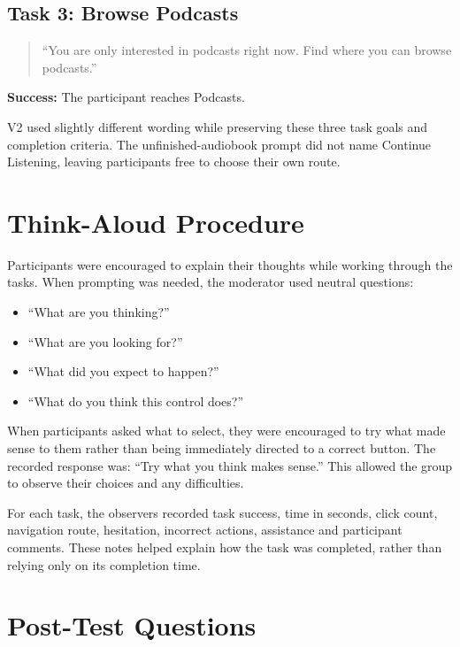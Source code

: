 \begin{samepage}
\subsection*{Task 3: Browse Podcasts}

\begin{quote}
``You are only interested in podcasts right now. Find where you can browse podcasts.''
\end{quote}

\noindent\textbf{Success:} The participant reaches Podcasts.
\end{samepage}

V2 used slightly different wording while preserving these three task goals and completion criteria. The unfinished-audiobook prompt did not name Continue Listening, leaving participants free to choose their own route.

\section{Think-Aloud Procedure}

Participants were encouraged to explain their thoughts while working through the tasks. When prompting was needed, the moderator used neutral questions:

\begin{itemize}
  \setlength{\itemsep}{2pt}
  \setlength{\parsep}{0pt}
  \item ``What are you thinking?''
  \item ``What are you looking for?''
  \item ``What did you expect to happen?''
  \item ``What do you think this control does?''
\end{itemize}

When participants asked what to select, they were encouraged to try what made sense to them rather than being immediately directed to a correct button. The recorded response was: ``Try what you think makes sense.'' This allowed the group to observe their choices and any difficulties.

For each task, the observers recorded task success, time in seconds, click count, navigation route, hesitation, incorrect actions, assistance and participant comments. These notes helped explain how the task was completed, rather than relying only on its completion time.

\section{Post-Test Questions}

